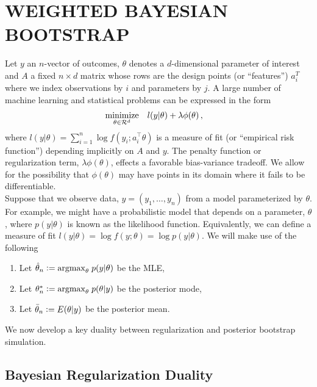 \documentclass[12pt]{TD-CJS}
\begin{document}
\section{WEIGHTED BAYESIAN BOOTSTRAP}
Let  $y$ an $n$-vector of outcomes, $\theta$ denotes a $d$-dimensional parameter of interest and $A$ a fixed $n \times d$ matrix whose rows are the design points (or ``features'') $a_i^T$
where we index  observations by $i$ and parameters by $j$.  
A large number of machine learning and statistical problems can be expressed in the form
\begin{equation}
\label{eqn:canonicalform}
\begin{aligned}
& \underset{\theta \in \R^d}{\text{minimize}}
& &  l(y| \theta) + \lambda\phi(\theta) \, ,
\end{aligned}
\end{equation}
where $l(y| \theta) = \sum_{i=1}^n \log f ( y_i ; a_i^\top \theta )$ is a measure of fit (or ``empirical risk function'') depending implicitly on $A$ and $y$.
The penalty function or regularization term, $\lambda\phi(\theta) $,  
effects a favorable bias-variance tradeoff.  We allow for the possibility that $\phi(\theta)$ may have points in its domain where it fails to be differentiable.  \\



\noindent Suppose that we observe data, $y = (y_1 , \ldots , y_n ) $ from a model parameterized by $\theta$. For example, we might have a probabilistic model that depends on a parameter, $\theta$, where $p(y|\theta)$ is known as the likelihood function. Equivalently, we can define a measure of fit $l(y| \theta) = \log f(y; \theta) = \log p(y|\theta)$. We will make use of the following
\begin{enumerate}[label=(\roman*)]
\item Let $ \hat{\theta}_n \mathrel{\mathop:}= {\rm arg max}_\theta\; p(y |\theta) $ be the MLE, 
\item Let $\theta^*_n \mathrel{\mathop:}= {\rm arg max}_\theta \; p( \theta|y) $ be the posterior mode,
\item Let $ \bar{\theta}_n \mathrel{\mathop:}= E(\theta | y) $ be the posterior mean.
\end{enumerate}
We now develop a key duality between regularization and posterior bootstrap simulation.

\subsection{Bayesian Regularization Duality}
\end{document}
